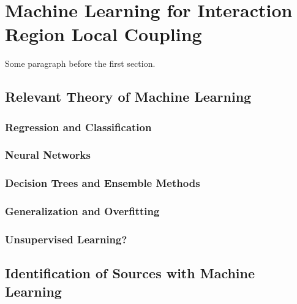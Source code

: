 
\chapter{Machine Learning for Interaction Region Local Coupling} %

\label{Chapter4} %


Some paragraph before the first section.


\section{Relevant Theory of Machine Learning}

\subsection{Regression and Classification}

\subsection{Neural Networks}

\subsection{Decision Trees and Ensemble Methods}

\subsection{Generalization and Overfitting}

\subsection{Unsupervised Learning?}


\section{Identification of Sources with Machine Learning}

